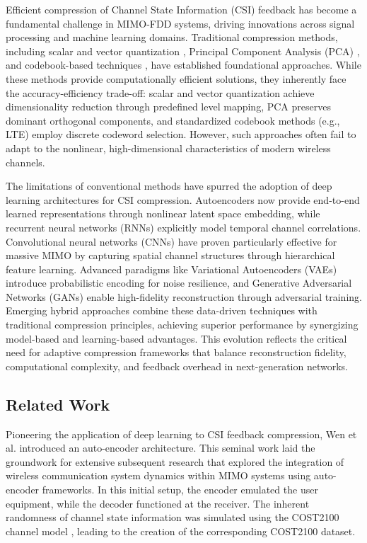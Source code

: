 \documentclass[lettersize,journal]{IEEEtran}
\begin{document}
Efficient compression of Channel State Information (CSI) feedback has become a fundamental challenge in MIMO-FDD systems, driving innovations across signal processing and machine learning domains. Traditional compression methods, including scalar and vector quantization \cite{vectorquantiz}, Principal Component Analysis (PCA) \cite{pca}, and codebook-based techniques \cite{compressivesensing}, have established foundational approaches. While these methods provide computationally efficient solutions, they inherently face the accuracy-efficiency trade-off: scalar and vector quantization achieve dimensionality reduction through predefined level mapping, PCA preserves dominant orthogonal components, and standardized codebook methods (e.g., LTE) employ discrete codeword selection. However, such approaches often fail to adapt to the nonlinear, high-dimensional characteristics of modern wireless channels.

The limitations of conventional methods have spurred the adoption of deep learning architectures for CSI compression. Autoencoders now provide end-to-end learned representations through nonlinear latent space embedding, while recurrent neural networks (RNNs) explicitly model temporal channel correlations. Convolutional neural networks (CNNs) have proven particularly effective for massive MIMO by capturing spatial channel structures through hierarchical feature learning. Advanced paradigms like Variational Autoencoders (VAEs) introduce probabilistic encoding for noise resilience, and Generative Adversarial Networks (GANs) enable high-fidelity reconstruction through adversarial training. Emerging hybrid approaches combine these data-driven techniques with traditional compression principles, achieving superior performance by synergizing model-based and learning-based advantages. This evolution reflects the critical need for adaptive compression frameworks that balance reconstruction fidelity, computational complexity, and feedback overhead in next-generation networks.


\subsection{Related Work}
Pioneering the application of deep learning to CSI feedback compression, Wen et al. \cite{abe} introduced an auto-encoder architecture. This seminal work laid the groundwork for extensive subsequent research that explored the integration of wireless communication system dynamics within MIMO systems using auto-encoder frameworks. In this initial setup, the encoder emulated the user equipment, while the decoder functioned at the receiver. The inherent randomness of channel state information was simulated using the COST2100 channel model \cite{abf}, leading to the creation of the corresponding COST2100 dataset.
\end{document}
